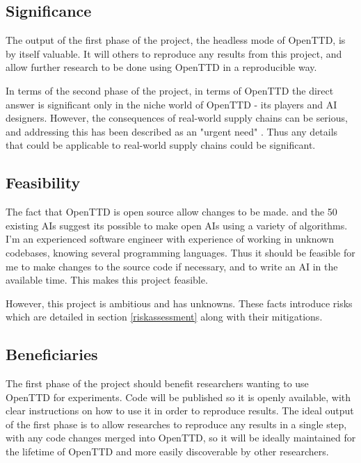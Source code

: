 \documentclass[a4paper,11pt]{article}
\begin{document}
\subsection{Significance}

The output of the first phase of the project, the headless mode of OpenTTD, is by itself valuable. It will others to reproduce any results from this project, and allow further research to be done using OpenTTD in a reproducible way.

In terms of the second phase of the project, in terms of OpenTTD the direct answer is significant only in the  niche world of OpenTTD - its players and AI designers. However, the consequences of real-world supply chains can be serious, and addressing this has been described as an "urgent need" \cite{moosavi_supply_2022}. Thus any details that could be applicable to real-world supply chains could be significant.

\subsection{Feasibility}

The fact that OpenTTD is open source allow changes to be made. and the 50 existing AIs suggest its possible to make open AIs using a variety of algorithms. I'm an experienced software engineer with experience of working in unknown codebases, knowing several programming languages. Thus it should be feasible for me to make changes to the source code if necessary, and to write an AI in the available time. This makes this project feasible.

However, this project is ambitious and has unknowns. These facts introduce risks which are detailed in section \ref{riskassessment} along with their mitigations.

\subsection{Beneficiaries}

The first phase of the project should benefit researchers wanting to use OpenTTD for experiments. Code will be published so it is openly available, with clear instructions on how to use it in order to reproduce results. The ideal output of the first phase is to allow researches to reproduce any results in a single step, with any code changes merged into OpenTTD, so it will be ideally maintained for the lifetime of OpenTTD and more easily discoverable by other researchers.
\end{document}
